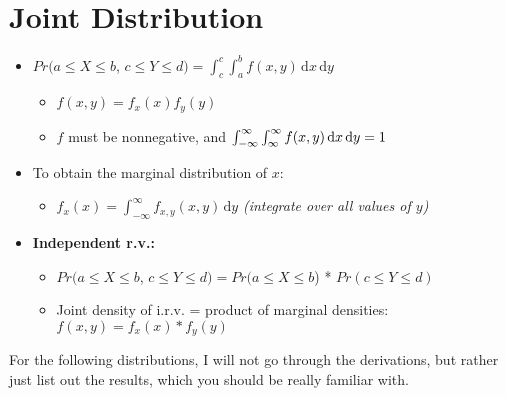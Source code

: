 \documentclass[a4paper]{article}
\begin{document}
\section{Joint Distribution}
\begin{itemize}
    \item $Pr(a \leq X \leq b$, $c \leq Y \leq d) = \int_{c}^c \int_{a}^b f(x,y) \, {\mathrm{d}}x \,{\mathrm{d}}y$
    \begin{itemize}
        \item $f(x,y) = f_x(x)f_y(y)$
        \item $f$ must be nonnegative, and $\int_{-\infty}^\infty \int_{\-\infty}^\infty f(x,y) \, {\mathrm{d}}x \,{\mathrm{d}}y = 1$
    \end{itemize}
    \item To obtain the marginal distribution of $x$:
    \begin{itemize}
        \item $f_x(x) = \int_{-\infty}^\infty f_{x,y}(x,y) \, {\mathrm{d}}y$ \textit{(integrate over all values of $y$)}
    \end{itemize}
    \item \textbf{Independent r.v.:}
    \begin{itemize}
        \item $Pr(a \leq X \leq b$, $c \leq Y \leq d) = Pr(a \leq X \leq b$) * $Pr(c \leq Y \leq d)$
        \item Joint density of i.r.v. = product of marginal densities:\\
        \indent $f(x,y) = f_x(x)*f_y(y)$
    \end{itemize}
\end{itemize}
For the following distributions, I will not go through the derivations, but rather just list out the results, which you should be really familiar with.
\end{document}
